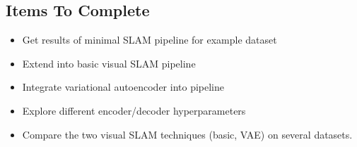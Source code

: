 \documentclass{article}
\begin{document}
\subsection*{Items To Complete}
\begin{itemize}
    \item Get results of minimal SLAM pipeline for example dataset
    \item Extend into basic visual SLAM pipeline
    \item Integrate variational autoencoder into pipeline
    \item Explore different encoder/decoder hyperparameters
    \item Compare the two visual SLAM techniques (basic, VAE) on several datasets.
\end{itemize}



\end{document}
